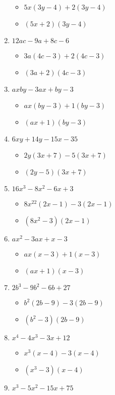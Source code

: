\documentclass{article}
\begin{document}
\begin{enumerate}
  \begin{itemize}
  \item $5x(3y-4)+2(3y-4)$
  \item $(5x+2)(3y-4)$
  \end{itemize}
\item $12ac - 9a + 8c - 6$
  \begin{itemize}
  \item $3a(4c-3)+2(4c-3)$
  \item $(3a+2)(4c-3)$
  \end{itemize}
\item $axby - 3ax + by - 3$
  \begin{itemize}
  \item $ax(by-3)+1(by-3)$
  \item $(ax+1)(by-3)$
  \end{itemize}
\item $6xy + 14y - 15x - 35$
  \begin{itemize}
  \item $2y(3x+7)-5(3x+7)$
  \item $(2y-5)(3x+7)$
  \end{itemize}
\item $16x^{3} - 8x^{2} - 6x + 3$
  \begin{itemize}
  \item $8x^{22}(2x-1)-3(2x-1)$
  \item $(8x^{2}-3)(2x-1)$
  \end{itemize}
\item $ax^{2} - 3ax + x - 3$
  \begin{itemize}
  \item $ax(x-3)+1(x-3)$
  \item $(ax+1)(x-3)$
  \end{itemize}
\item $2b^{3} - 9b^{2} - 6b + 27$
  \begin{itemize}
  \item $b^{2}(2b-9)-3(2b-9)$
  \item $(b^{2}-3)(2b-9)$
  \end{itemize}
\item $x^{4} - 4x^{3} - 3x + 12$
  \begin{itemize}
  \item $x^{3}(x-4)-3(x-4)$
  \item $(x^{3}-3)(x-4)$
  \end{itemize}
\item $x^{3} - 5x^{2} - 15x + 75$

\end{enumerate}
\end{document}
